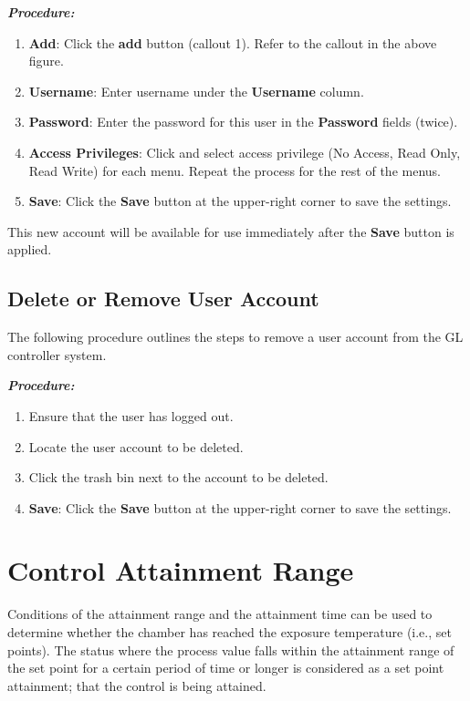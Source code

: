\textbf{\emph{Procedure:}}

\begin{enumerate}
\def\labelenumi{\arabic{enumi}.}
\tightlist
\item
  \textbf{Add}: Click the \textbf{add} button (callout 1). Refer to the
  callout in the above figure.\\
\item
  \textbf{Username}: Enter username under the \textbf{Username}
  column.\\
\item
  \textbf{Password}: Enter the password for this user in the
  \textbf{Password} fields (twice).
\item
  \textbf{Access Privileges}: Click and select access privilege (No
  Access, Read Only, Read Write) for each menu. Repeat the process for
  the rest of the menus.
\item
  \textbf{Save}: Click the \textbf{Save} button at the upper-right
  corner to save the settings.
\end{enumerate}

This new account will be available for use immediately after the
\textbf{Save} button is applied.


\subsection{Delete or Remove User
Account}

The following procedure outlines the steps to remove a user account from
the GL controller system.

\textbf{\emph{Procedure:}}

\begin{enumerate}
\def\labelenumi{\arabic{enumi}.}
\tightlist
\item
  Ensure that the user has logged out.
\item
  Locate the user account to be deleted.
\item
  Click the trash bin next to the account to be deleted.
\item
  \textbf{Save}: Click the \textbf{Save} button at the upper-right
  corner to save the settings.
\end{enumerate}


\section{Control Attainment
Range}

Conditions of the attainment range and the attainment time can be used
to determine whether the chamber has reached the exposure temperature
(i.e., set points). The status where the process value falls within the
attainment range of the set point for a certain period of time or longer
is considered as a set point attainment; that the control is being
attained.


